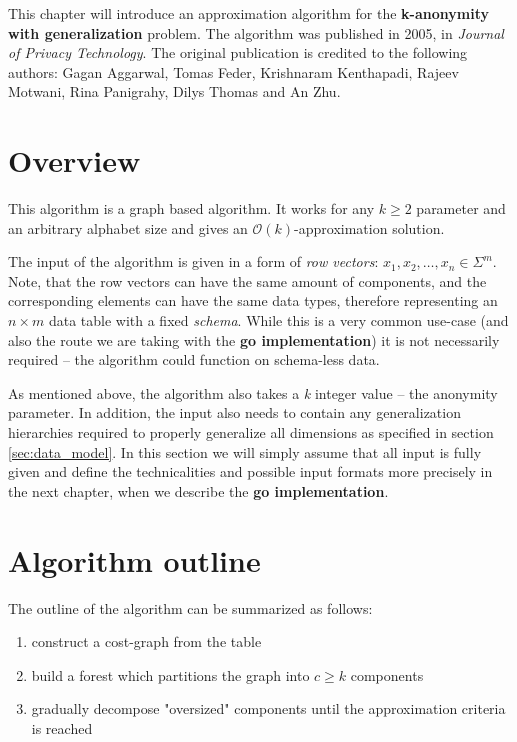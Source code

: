 This chapter will introduce an approximation algorithm for the \textbf{k-anonymity with generalization} problem. The algorithm was published in 2005, in \textit{Journal of Privacy Technology}. \cite{aggarwal} The original publication is credited to the following authors: Gagan Aggarwal, Tomas Feder, Krishnaram Kenthapadi, Rajeev Motwani, Rina Panigrahy, Dilys Thomas and An Zhu.

\section{Overview}

This algorithm is a graph based algorithm. It works for any \(k\ge2\) parameter and an arbitrary alphabet size and gives an \(\mathcal{O}(k)\)-approximation solution.

The input of the algorithm is given in a form of \textit{row vectors}: \(x_1, x_2, \dots, x_n \in \Sigma^m\). Note, that the row vectors can have the same amount of components, and the corresponding elements can have the same data types, therefore representing an \(n \times m\) data table with a fixed \textit{schema}. While this is a very common use-case (and also the route we are taking with the \textbf{go implementation}) it is not necessarily required -- the algorithm could function on schema-less data.

As mentioned above, the algorithm also takes a \textit{k} integer value -- the anonymity parameter. In addition, the input also needs to contain any generalization hierarchies required to properly generalize all dimensions as specified in section \ref{sec:data_model}. In this section we will simply assume that all input is fully given and define the technicalities and possible input formats more precisely in the next chapter, when we describe the \textbf{go implementation}.

\section{Algorithm outline} \label{sec:algorithm_outline}

The outline of the algorithm can be summarized as follows:

\begin{enumerate}
    \item construct a cost-graph from the table
    \item build a forest which partitions the graph into \(c \ge k\) components
    \item gradually decompose "oversized" components until the approximation criteria is reached
\end{enumerate}

